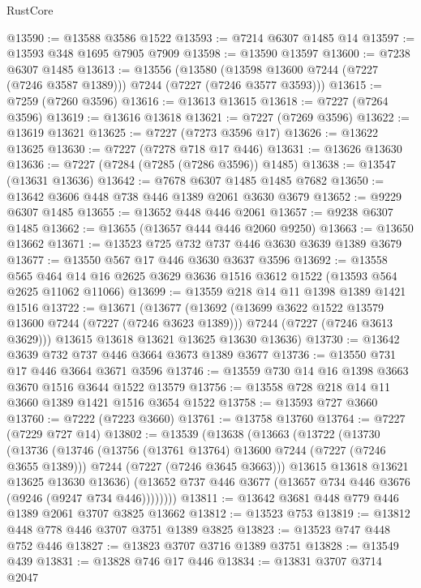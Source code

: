 \begin{lexlean}{RustCore}
\begin{coremodule}
@13590 := @13588 @3586 @1522
@13593 := @7214 @6307 @1485 @14
@13597 := @13593 @348 @1695 @7905 @7909
@13598 := @13590 @13597
@13600 := @7238 @6307 @1485
@13613 := @13556
    (@13580 (@13598 @13600 @7244 (@7227 (@7246 @3587 @1389))) @7244 (@7227 (@7246 @3577 @3593)))
@13615 := @7259 (@7260 @3596)
@13616 := @13613 @13615
@13618 := @7227 (@7264 @3596)
@13619 := @13616 @13618
@13621 := @7227 (@7269 @3596)
@13622 := @13619 @13621
@13625 := @7227 (@7273 @3596 @17)
@13626 := @13622 @13625
@13630 := @7227 (@7278 @718 @17 @446)
@13631 := @13626 @13630
@13636 := @7227 (@7284 (@7285 (@7286 @3596)) @1485)
@13638 := @13547 (@13631 @13636)
@13642 := @7678 @6307 @1485 @1485 @7682
@13650 := @13642 @3606 @448 @738 @446 @1389 @2061 @3630 @3679
@13652 := @9229 @6307 @1485
@13655 := @13652 @448 @446 @2061
@13657 := @9238 @6307 @1485
@13662 := @13655 (@13657 @444 @446 @2060 @9250)
@13663 := @13650 @13662
@13671 := @13523 @725 @732 @737 @446 @3630 @3639 @1389 @3679
@13677 := @13550 @567 @17 @446 @3630 @3637 @3596
@13692 := @13558
    @565
    @464
    @14
    @16
    @2625
    @3629
    @3636
    @1516
    @3612
    @1522
    (@13593 @564 @2625 @11062 @11066)
@13699 := @13559 @218 @14 @11 @1398 @1389 @1421 @1516
@13722 := @13671
    (@13677
      (@13692
        (@13699 @3622 @1522 @13579 @13600 @7244 (@7227 (@7246 @3623 @1389)))
        @7244
        (@7227 (@7246 @3613 @3629)))
      @13615
      @13618
      @13621
      @13625
      @13630
      @13636)
@13730 := @13642 @3639 @732 @737 @446 @3664 @3673 @1389 @3677
@13736 := @13550 @731 @17 @446 @3664 @3671 @3596
@13746 := @13559 @730 @14 @16 @1398 @3663 @3670 @1516 @3644 @1522 @13579
@13756 := @13558 @728 @218 @14 @11 @3660 @1389 @1421 @1516 @3654 @1522
@13758 := @13593 @727 @3660
@13760 := @7222 (@7223 @3660)
@13761 := @13758 @13760
@13764 := @7227 (@7229 @727 @14)
@13802 := @13539
    (@13638
      (@13663
        (@13722
          (@13730
            (@13736
              (@13746
                (@13756 (@13761 @13764) @13600 @7244 (@7227 (@7246 @3655 @1389)))
                @7244
                (@7227 (@7246 @3645 @3663)))
              @13615
              @13618
              @13621
              @13625
              @13630
              @13636)
            (@13652 @737 @446 @3677 (@13657 @734 @446 @3676 (@9246 (@9247 @734 @446))))))))
@13811 := @13642 @3681 @448 @779 @446 @1389 @2061 @3707 @3825 @13662
@13812 := @13523 @753
@13819 := @13812 @448 @778 @446 @3707 @3751 @1389 @3825
@13823 := @13523 @747 @448 @752 @446
@13827 := @13823 @3707 @3716 @1389 @3751
@13828 := @13549 @439
@13831 := @13828 @746 @17 @446
@13834 := @13831 @3707 @3714 @2047

\end{coremodule}
\end{lexlean}
